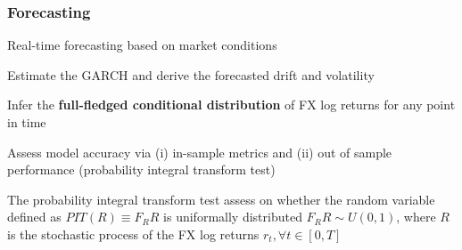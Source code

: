 \documentclass{beamer}
\newenvironment{largeitemize}{\itemize\addtolength{\itemsep}{10pt}}{\enditemize}
\begin{document}
\begin{frame}
  \frametitle{Forecasting}

  \begin{largeitemize}
      \item Real-time forecasting based on market conditions
    \item Estimate the GARCH and derive the forecasted drift and volatility
    \item Infer the \textbf{full-fledged conditional distribution} of FX log returns for any point
      in time
    \item Assess model accuracy via (i) in-sample metrics and (ii) out of
      sample performance (probability integral transform test)
    \item The probability integral transform test assess on whether the random
      variable defined as $PIT(R) \equiv F_{R}R$ is uniformally distributed
      $F_{R}R \sim U(0,1)$, where $R$ is the stochastic process of the FX log returns $r_t, \forall t \in
      [0, T]$
  \end{largeitemize}
  
\end{frame}


\begin{frame}
\end{frame}
\end{document}
